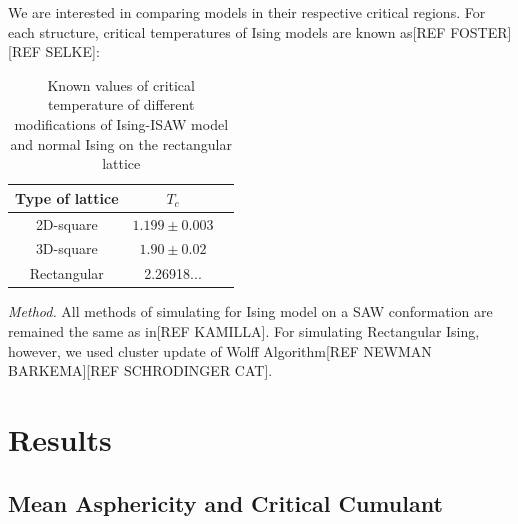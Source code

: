\documentclass[aps,pre,amssymb,amsmath,twocolumn,floatfix]{revtex4-2}
\begin{document}
We are interested in comparing models in their respective critical regions. For each structure, critical temperatures of Ising models are known as[REF FOSTER][REF SELKE]:

\begin{table}[h]
    \centering
    \begin{tabular}{|c|c|c|}
        \hline
        Type of lattice & $T_{c}$ \\ \hline
        2D-square & $1.199 \pm 0.003$ \\ \hline
        3D-square & $1.90 \pm 0.02$\\ \hline
        Rectangular & 2.26918...\\ \hline
    \end{tabular}
    \caption{Known values of critical temperature of different modifications of Ising-ISAW model and normal Ising on the rectangular lattice}
    \label{tab:my_label}
\end{table}


\textit{Method.} All methods of simulating for Ising model on a SAW conformation are remained the same as in[REF KAMILLA]. For simulating Rectangular Ising, however, we used cluster update of Wolff Algorithm[REF NEWMAN BARKEMA][REF SCHRODINGER CAT].




\section{Results}

\subsection{Mean Asphericity and Critical Cumulant}

\end{document}
